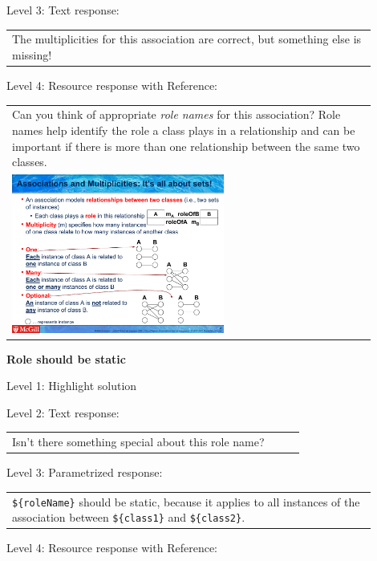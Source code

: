 \noindent Level 3: Text response: \medskip

\begin{tabular}{|p{0.9\linewidth}}
The multiplicities for this association are correct, but something else is missing!
\end{tabular} \medskip

\noindent Level 4: Resource response with Reference: \medskip

\begin{tabular}{|p{0.9\linewidth}}
Can you think of appropriate \textit{role names}
for this association? Role names help identify the role a class plays in a
relationship and can be important if there is more than one relationship
between the same two classes.

\\
\includegraphics[width=0.6\textwidth]{images/role_name.png}

\end{tabular} \medskip


\noindent \textbf{Role should be static} \medskip

\noindent Level 1: Highlight solution \medskip

\noindent Level 2: Text response: \medskip

\begin{tabular}{|p{0.9\linewidth}}
Isn't there something special about this role name?
\end{tabular} \medskip

\noindent Level 3: Parametrized response: \medskip

\begin{tabular}{|p{0.9\linewidth}}
\verb|${roleName}| should be static, because it applies to all instances of the association between \verb|${class1}| and \verb|${class2}|.
\end{tabular} \medskip

\noindent Level 4: Resource response with Reference: \medskip

